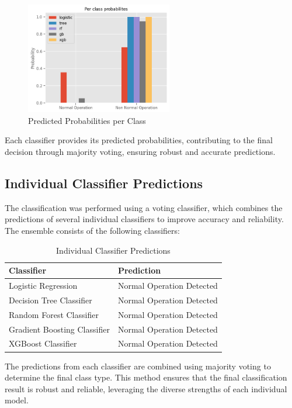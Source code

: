 \documentclass{article}
\begin{document}
\begin{figure}[H]
\centering
\includegraphics[width=0.57\textwidth]{img/per_class_prob.png}
\caption{Predicted Probabilities per Class}
\label{fig:class_probabilities}
\end{figure}


Each classifier provides its predicted probabilities, contributing to the final decision through majority voting, ensuring robust and accurate predictions.



\subsection{Individual Classifier Predictions}

The classification was performed using a voting classifier, which combines the predictions of several individual classifiers to improve accuracy and reliability. The ensemble consists of the following classifiers:

\begin{table}[h]
\centering
\begin{tabular}{|l|l|}
\hline
\textbf{Classifier} & \textbf{Prediction} \\ \hline
Logistic Regression & Normal Operation Detected \\ \hline
Decision Tree Classifier & Normal Operation Detected \\ \hline
Random Forest Classifier & Normal Operation Detected \\ \hline
Gradient Boosting Classifier & Normal Operation Detected \\ \hline
XGBoost Classifier & Normal Operation Detected \\ \hline
\end{tabular}
\caption{Individual Classifier Predictions}
\label{table:individual_predictions}
\end{table}

The predictions from each classifier are combined using majority voting to determine the final class type. This method ensures that the final classification result is robust and reliable, leveraging the diverse strengths of each individual model.
\end{document}
